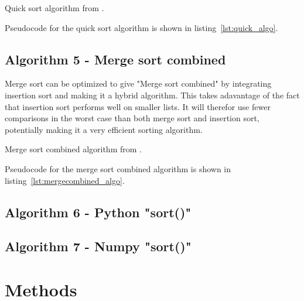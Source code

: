 \documentclass[sigconf, nonacm, natbib, screen, balance=False]{acmart}
\begin{document}
\begin{listing}
  \caption{Quick sort algorithm from \citet[Ch.~2.1]{CLRS_2009}.}
  \label{lst:quick_algo}
  
  \begin{codebox}

  \end{codebox}
\end{listing}

Pseudocode for the quick sort algorithm is shown in 
listing~\ref{lst:quick_algo}. 

\subsection{Algorithm 5 - Merge sort combined}\label{sec:algo2}

Merge sort can be optimized to give "Merge sort combined" by integrating insertion sort and making it a hybrid algorithm. This takes adavantage of the fact that insertion sort performs well on smaller lists. It will therefor use fewer comparisons in the worst case than both merge sort and insertion sort, potentially making it a very efficient sorting algorithm.  

\begin{listing}
  \caption{Merge sort combined algorithm from \citet[Ch.~2.1]{CLRS_2009}.}
  \label{lst:mergecombined_algo}
  
  \begin{codebox}

  \end{codebox}
\end{listing}

Pseudocode for the merge sort combined algorithm is shown in listing~\ref{lst:mergecombined_algo}. 

\subsection{Algorithm 6 - Python "sort()" }\label{sec:algo2}

\subsection{Algorithm 7 - Numpy "sort()" }\label{sec:algo2}

\section{Methods}\label{sec:methods}
\end{document}
